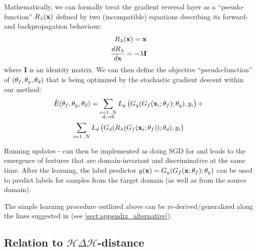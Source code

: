 Mathematically, we can formally treat the gradient reversal layer as a ``pseudo-function'' $R_\lambda({\mathbf x})$ defined by two (incompatible) equations describing its forward- and backpropagation behaviour:
\begin{align}
R_\lambda({\mathbf x}) = {\mathbf x}\\
\frac{dR_\lambda}{d{\mathbf x}} = -\lambda \mathbf{I}
\end{align}
where $\mathbf{I}$ is an identity matrix.
We can then define the objective ``pseudo-function'' of $({\theta_f},{\theta_y},{\theta_d})$ that is being optimized by the stochastic gradient descent within our method:
\begin{gather}
\tilde E({\theta_f},{\theta_y},{\theta_d}) =  \sum_{\substack{i=1..N\\d_i = 0}} L_y\left( \strut G_y(G_f({\mathbf x}_i;{\theta_f});{\theta_y}), y_i\right) +\nonumber\\ \sum_{i=1..N} L_d \left( \strut G_d(R_\lambda(G_f({\mathbf x}_i;{\theta_f}));{\theta_d}), y_i\right) \label{eq:pseudoobj}
\end{gather}

Running updates - can then be implemented as doing SGD for  and leads to the emergence of features that are domain-invariant and discriminative at the same time. After the learning, the label predictor $y({\mathbf x}) = G_y(G_f({\mathbf x};{\theta_f});{\theta_y})$ can be used to predict labels for samples from the target domain (as well as from the source domain).

The simple learning procedure outlined above can be re-derived/generalized along the lines suggested in \cite{Goodfellow14} (see \ref{sect:appendix_alternative}).

\subsection{Relation to $ \mathcal{H} \Delta \mathcal{H} $-distance}
\label{sect:theory}


